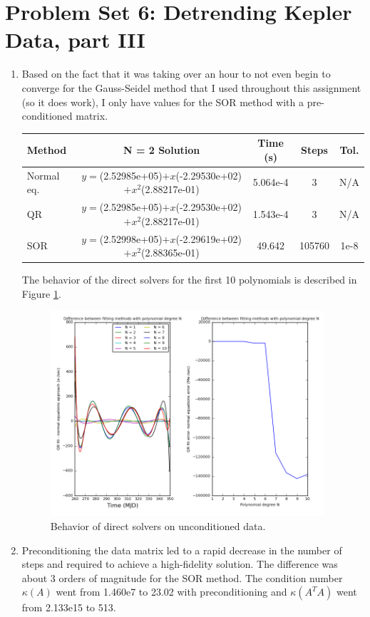 \documentclass[10pt, preprint]{aastex}
\begin{document}
\section*{Problem Set 6: Detrending Kepler Data, part III}
\begin{enumerate}
\item Based on the fact that it was taking over an hour to not even begin to converge for the Gauss-Seidel method that I used throughout this assignment (so it does work), I only have values for the SOR method with a pre-conditioned matrix.

\begin{table}[!ht]
\centering
\begin{tabular}{l c c c c}
  \bf{Method} & \bf{N = 2 Solution} & \bf{Time (s)} & \bf{Steps} & \bf{Tol.}\\ \hline
  Normal eq. & $y=$(2.52985e+05)$+x$(-2.29530e+02)$+x^2$(2.88217e-01) & 5.064e-4 & 3 & N/A \\
  QR & $y=$(2.52985e+05)$+x$(-2.29530e+02)$+x^2$(2.88217e-01) & 1.543e-4 & 3 & N/A \\
  SOR &  $y=$(2.52998e+05)$+x$(-2.29619e+02)$+x^2$(2.88365e-01) & 49.642 & 105760 & 1e-8\\
\end{tabular}
\end{table}
The behavior of the direct solvers for the first 10 polynomials is described in Figure \ref{fig1}.
\begin{figure}[!ht]
  \centering
  \includegraphics[width=4in]{hw6_fig1_unc.png}
  \caption{\centering Behavior of direct solvers on unconditioned data. \label{fig1}}
\end{figure}


\item Preconditioning the data matrix led to a rapid decrease in the number of steps and required to achieve a high-fidelity solution. The difference was about 3 orders of magnitude for the SOR method. The condition number $\kappa(A)$ went from 1.460e7 to 23.02 with preconditioning and $\kappa(A^TA)$ went from 2.133e15 to 513.


\end{enumerate}
\end{document}
